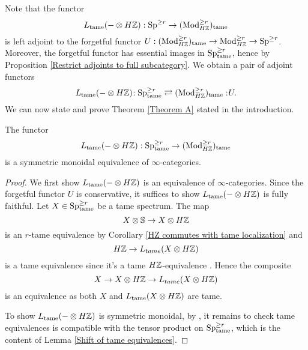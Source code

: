 Note that the functor 
$$
L_{\operatorname{\operatorname{tame}}}(-\otimes H{\mathbb{Z}}): \operatorname{Sp}^{\geq r} \to 
(\operatorname{Mod}^{\geq r}_{H{\mathbb{Z}}})_{\operatorname{\operatorname{tame}}}
$$
is left adjoint to the forgetful functor $U: (\operatorname{Mod}^{\geq r}_{H{\mathbb{Z}}})_{\operatorname{\operatorname{tame}}} \to \operatorname{Mod}^{\geq r}_{H{\mathbb{Z}}}
\to \operatorname{Sp}^{\geq r}
$. Moreover, the forgetful functor has essential images in $\operatorname{Sp}^{\geq r}_{\operatorname{\operatorname{tame}}}$, hence by Proposition \ref{Restrict adjoints to full subcategory}. 
We obtain a pair of adjoint functors
\[
L_{\operatorname{\operatorname{tame}}}(-\otimes H{\mathbb{Z}})\negmedspace: \operatorname{Sp}^{\geq r}_{\operatorname{\operatorname{tame}}}\rightleftarrows (\operatorname{Mod}^{\geq r}_{H{\mathbb{Z}}})_{\operatorname{\operatorname{tame}}}:\negmedspace U.
\]
We can now state and prove Theorem \ref{Theorem A} stated in the introduction.
\begin{theorem}
	\label{algebraic description of tame spectra}
	The functor
	$$
	L_{\operatorname{\operatorname{tame}}}(-\otimes H{\mathbb{Z}}):
	\operatorname{Sp}^{\geq r}_{\operatorname{\operatorname{tame}}} \to (\operatorname{Mod}^{\geq r}_{H{\mathbb{Z}}})_{\operatorname{\operatorname{tame}}}
	$$
	is a symmetric monoidal equivalence of $\infty$-categories.
\end{theorem}
\begin{proof}
    We first show $L_{\operatorname{\operatorname{tame}}}(-\otimes H{\mathbb{Z}})$ is an equivalence of $\infty$-categories.
    Since the forgetful functor $U$ is conservative, it suffices to show $L_{\operatorname{\operatorname{tame}}}(-\otimes H{\mathbb{Z}})$ is fully faithful.
	Let $X\in \operatorname{Sp}^{\geq r}_{\operatorname{\operatorname{tame}}}$ be a tame spectrum. The map 
	$$
	X\otimes {\mathbb{S}} \to X\otimes H{\mathbb{Z}}
	$$ is an $r$-tame equivalence by Corollary \ref{HZ commutes with tame localization}
	and 
	$$
	H{\mathbb{Z}} \to L_{tame}(X\otimes H{\mathbb{Z}})
	$$
	is a tame equivalence since it's a tame $H{\mathbb{Z}}$-equivalence
	. 
	Hence the composite 
	$$
	X \to X\otimes H{\mathbb{Z}} \to L_{tame}(X\otimes H{\mathbb{Z}})
	$$ is an equivalence as both $X$ and $L_{\operatorname{\operatorname{tame}}}(X\otimes H{\mathbb{Z}})$ are tame.
	
	To show $L_{\operatorname{\operatorname{tame}}}(-\otimes H{\mathbb{Z}})$ is symmetric monoidal, by \cite[Proposition 2.2.1.9.]{HA}, it remains to check tame equivalences is compatible with the tensor product on $\operatorname{Sp}^{\geq r}_{\operatorname{\operatorname{tame}}}$, which is the content of Lemma \ref{Shift of tame equivalences}.
	
	
	
	\end{proof}
	

